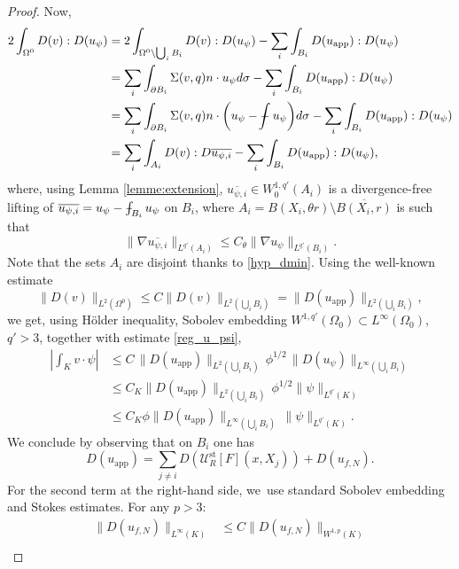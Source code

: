 \documentclass[10pt]{amsart}
\newcommand{\app}{\mathrm{app}}
\newcommand{\st}{\mathrm{st}}
\def\Xint#1{\mathchoice
{\XXint\displaystyle\textstyle{#1}}%
{\XXint\textstyle\scriptstyle{#1}}%
{\XXint\scriptstyle\scriptscriptstyle{#1}}%
{\XXint\scriptscriptstyle\scriptscriptstyle{#1}}%
\!\int}
\def\XXint#1#2#3{{\setbox0=\hbox{$#1{#2#3}{\int}$ }
\vcenter{\hbox{$#2#3$ }}\kern-.6\wd0}}
\def\dashint{\Xint-}
\theoremstyle{plain}
\theoremstyle{definition}
\let\na\nabla
\let\oldbigcup\bigcup
\begin{document}
\begin{proof}
Now,
\begin{align*}
2\int_{\Omega^0} D(v): D (u_\psi) &= 2\int_{\Omega^0\setminus \oldbigcup_i {B}_i} D(v): D (u_\psi) - \sum_i \int_{B_i} D(u_{\app}): D(u_\psi)\\
&=\sum_i \int_{\partial B_i} \Sigma(v,q)n \cdot u_\psi d \sigma - \sum_i \int_{B_i} D(u_{\app}): D(u_\psi)\\
&=\sum_i \int_{\partial B_i} \Sigma(v,q)n \cdot \biggl(u_\psi - \dashint u_\psi \biggr)d \sigma - \sum_i \int_{B_i} D(u_{\app}): D(u_\psi)\\
&= \sum_i \int_{A_i} D(v):D \overline{u_{\psi,i}} - \sum_i \int_{B_i} D(u_{\app}): D(u_\psi),
\end{align*}
where, using Lemma \ref{lemme:extension}, $\overline{u_{\psi,i}} \in W^{1,q'}_0(A_i)$ is a divergence-free lifting of $ \overline{u_{\psi,i}}=u_\psi -\nobreak \dashint_{B_i} u_\psi$ on $B_i$, where $A_i =B(X_i,\theta r)\setminus \overline{B(X_i,r)}$ is such that
\begin{equation}\label{eq:bound_u_psi_i}
\|\na \overline{u_{\psi,i}}\|_{L^{q'}(A_i)}\leq C_\theta \|\nabla u_\psi \|_{L^{q'}(B_i)}.
\end{equation}
Note that the sets $A_i$ are disjoint thanks to \eqref{hyp_dmin}. Using the well-known estimate \cite[Prop.\,2.1]{Gerard-VaretMecherbet20}
\[
\|D(v)\|_{L^2(\Omega^0)} \le C\|D(v)\|_{L^2(\oldbigcup_i B_i)} = \|D\left(u_{\app}\right)\|_{L^2(\oldbigcup_i B_i)},
\]
we get, using Hölder inequality, Sobolev embedding $W^{1,q'}(\Omega_0) \subset L^\infty(\Omega_0) $, $q'>3$, together with estimate \eqref{reg_u_psi},
\begin{align*}
\left |\int_K v \cdot \psi \right|& \leq C\,\|D \left(u_{\app}\right)\|_{L^2(\oldbigcup_i B_i)}\,\phi^{1/2}\, \|D \left(u_{\psi}\right)\|_{L^\infty(\oldbigcup_i B_i)}\\
&\leq C_K \| D\left(u_{\app}\right) \|_{L^2(\oldbigcup_i B_i)}\, \phi^{1/2} \|\psi\|_{L^{q'}(K)}\\
&\leq C_K \phi\| D\left(u_{\app} \right)\|_{L^\infty(\oldbigcup_i B_i)}\, \|\psi\|_{L^{q'}(K)}.
\end{align*}
We conclude by observing that on $B_i$ one has
\[
D\left(u_{\app}\right)= \sum_{j \neq i} D\left(\mathcal{U}^{\st}_R[F] (x,X_j)\right)+ D(u_{f,N}).
\]
For the second term at the right-hand side, we~use standard Sobolev embedding and Stokes estimates. For any $p > 3$:
\begin{align*}
\|D\left(u_{f,N}\right)\|_{L^\infty(K)} &\le C \|D\left(u_{f,N}\right)\|_{W^{1,p}(K)}\\

\end{align*}
\end{proof}
\end{document}
